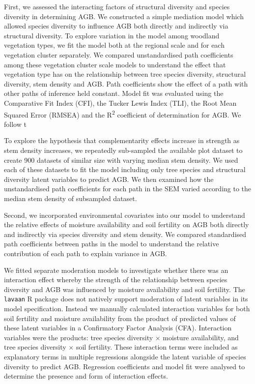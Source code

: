 \documentclass[11pt,a4paper]{article}
\begin{document}
First, we assessed the interacting factors of structural diversity and species diversity in determining AGB. We constructed a simple mediation model which allowed species diversity to influence AGB both directly and indirectly via structural diversity. To explore variation in the model among woodland vegetation types, we fit the model both at the regional scale and for each vegetation cluster separately. We compared unstandardised path coefficients among these vegetation cluster scale models to understand the effect that vegetation type has on the relationship between tree species diversity, structural diversity, stem density and AGB. Path coefficients show the effect of a path with other paths of inference held constant. Model fit was evaluated using the Comparative Fit Index (CFI), the Tucker Lewis Index (TLI), the Root Mean Squared Error (RMSEA) and the R\textsuperscript{2} coefficient of determination for AGB. We follow t

To explore the hypothesis that complementarity effects increase in strength as stem density increases, we repeatedly sub-sampled the available plot dataset to create 900 datasets of similar size with varying median stem density. We used each of these datasets to fit the model including only tree species and structural diversity latent variables to predict AGB. We then examined how the unstandardised path coefficients for each path in the SEM varied according to the median stem density of subsampled dataset.

Second, we incorporated environmental covariates into our model to understand the relative effects of moisture availability and soil fertility on AGB both directly and indirectly via species diversity and stem density. We compared standardised path coefficients between paths in the model to understand the relative contribution of each path to explain variance in AGB.

We fitted separate moderation models to investigate whether there was an interaction effect whereby the strength of the relationship between species diversity and AGB was influenced by moisture availability and soil fertility. The \verb|lavaan| R package does not natively support moderation of latent variables in its model specification. Instead we manually calculated interaction variables for both soil fertility and moisture availability from the product of predicted values of these latent variables in a Confirmatory Factor Analysis (CFA). Interaction variables were the products: tree species diversity $\times$ moisture availability, and tree species diversity $\times$ soil fertility. These interaction terms were included as explanatory terms in multiple regressions alongside the latent variable of species diversity to predict AGB. Regression coefficients and model fit were analysed to determine the presence and form of interaction effects.
\end{document}
